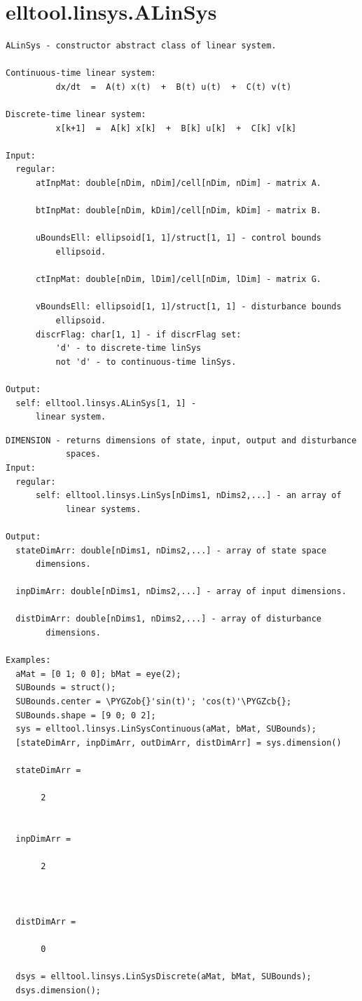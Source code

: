 \documentclass[letterpaper,10pt,english]{sphinxmanual}
\def\PYGZob{\char`\{}
\def\PYGZcb{\char`\}}
\begin{document}
\section{elltool.linsys.ALinSys}
\label{chap_func:elltool-linsys-alinsys}
\begin{Verbatim}[commandchars=\\\{\}]
ALinSys - constructor abstract class of linear system.

Continuous-time linear system:
          dx/dt  =  A(t) x(t)  +  B(t) u(t)  +  C(t) v(t)

Discrete-time linear system:
          x[k+1]  =  A[k] x[k]  +  B[k] u[k]  +  C[k] v[k]

Input:
  regular:
      atInpMat: double[nDim, nDim]/cell[nDim, nDim] - matrix A.

      btInpMat: double[nDim, kDim]/cell[nDim, kDim] - matrix B.

      uBoundsEll: ellipsoid[1, 1]/struct[1, 1] - control bounds
          ellipsoid.

      ctInpMat: double[nDim, lDim]/cell[nDim, lDim] - matrix G.

      vBoundsEll: ellipsoid[1, 1]/struct[1, 1] - disturbance bounds
          ellipsoid.
      discrFlag: char[1, 1] - if discrFlag set:
          'd' - to discrete-time linSys
          not 'd' - to continuous-time linSys.

Output:
  self: elltool.linsys.ALinSys[1, 1] -
      linear system.
\end{Verbatim}
\label{chap_func:elltool-linsys-alinsys-dimension}
\begin{Verbatim}[commandchars=\\\{\}]
DIMENSION - returns dimensions of state, input, output and disturbance
            spaces.
Input:
  regular:
      self: elltool.linsys.LinSys[nDims1, nDims2,...] - an array of
            linear systems.

Output:
  stateDimArr: double[nDims1, nDims2,...] - array of state space
      dimensions.

  inpDimArr: double[nDims1, nDims2,...] - array of input dimensions.

  distDimArr: double[nDims1, nDims2,...] - array of disturbance
        dimensions.

Examples:
  aMat = [0 1; 0 0]; bMat = eye(2);
  SUBounds = struct();
  SUBounds.center = \PYGZob{}'sin(t)'; 'cos(t)'\PYGZcb{};
  SUBounds.shape = [9 0; 0 2];
  sys = elltool.linsys.LinSysContinuous(aMat, bMat, SUBounds);
  [stateDimArr, inpDimArr, outDimArr, distDimArr] = sys.dimension()

  stateDimArr =

       2


  inpDimArr =

       2



  distDimArr =

       0

  dsys = elltool.linsys.LinSysDiscrete(aMat, bMat, SUBounds);
  dsys.dimension();
\end{Verbatim}
\end{document}
